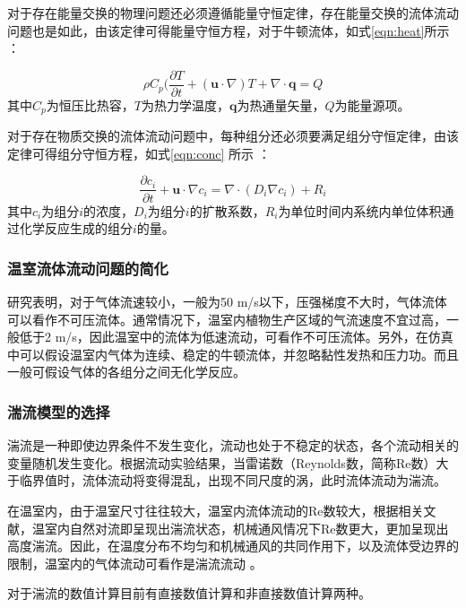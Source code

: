 对于存在能量交换的物理问题还必须遵循能量守恒定律，存在能量交换的流体流动问题也是如此，由该定律可得能量守恒方程，对于牛顿流体，如式\ref{eqn:heat}所示\supercite{ComsolHeat2015,WangFujun2004} ：

	\begin{equation}
		\label{eqn:heat}
		\rho C_p (\frac{\partial T}{\partial t}+(\mathbf{u} \cdot \nabla) T + \nabla \cdot \mathbf{q}  =Q
	\end{equation}
其中$C_p$为恒压比热容，$T$为热力学温度，$\mathbf{q}$为热通量矢量，$Q$为能量源项。

对于存在物质交换的流体流动问题中，每种组分还必须要满足组分守恒定律，由该定律可得组分守恒方程，如式\ref{eqn:conc} 所示\supercite{ComsolChem2015,WangFujun2004} ：

	\begin{equation}
		\label{eqn:conc}
		\frac{\partial c_i}{\partial t}+\mathbf{u} \cdot \nabla c_i = \nabla \cdot (D_i \nabla c_i ) + R_i
	\end{equation}
其中$c_i$为组分$i$的浓度，$D_i$为组分$i$的扩散系数，$R_i$为单位时间内系统内单位体积通过化学反应生成的组分$i$的量。

		\subsubsection{温室流体流动问题的简化}
研究表明，对于气体流速较小，一般为50 m/s以下，压强梯度不大时，气体流体可以看作不可压流体。通常情况下，温室内植物生产区域的气流速度不宜过高，一般低于2 m/s，因此温室中的流体为低速流动，可看作不可压流体。另外，在仿真中可以假设温室内气体为连续、稳定的牛顿流体，并忽略黏性发热和压力功。而且一般可假设气体的各组分之间无化学反应。

		\subsubsection{湍流模型的选择}
湍流是一种即使边界条件不发生变化，流动也处于不稳定的状态，各个流动相关的变量随机发生变化。根据流动实验结果，当雷诺数（Reynolds数，简称Re数）大于临界值时，流体流动将变得混乱，出现不同尺度的涡，此时流体流动为湍流。

在温室内，由于温室尺寸往往较大，温室内流体流动的Re数较大，根据相关文献，温室内自然对流即呈现出湍流状态，机械通风情况下Re数更大，更加呈现出高度湍流。因此，在温度分布不均匀和机械通风的共同作用下，以及流体受边界的限制，温室内的气体流动可看作是湍流流动\supercite{WangFujun2004} 。

对于湍流的数值计算目前有直接数值计算和非直接数值计算两种。

